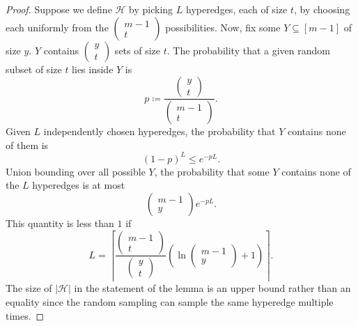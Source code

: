 \documentclass{article}
\begin{document}
\begin{proof}
    Suppose we define $\mathcal{H}$ by picking $L$ hyperedges, each of size $t$, by choosing each uniformly from the $\left(\begin{smallmatrix}m-1\\t\end{smallmatrix}\right)$ possibilities. Now, fix some $Y \subseteq [m-1]$ of size $y$. $Y$ contains $\left(\begin{smallmatrix}y\\t\end{smallmatrix}\right)$ sets of size $t$. The probability that a given random subset of size $t$ lies inside $Y$ is
    \begin{equation}
        p \coloneq \frac{\begin{pmatrix}
            y\\t
        \end{pmatrix}}{\begin{pmatrix}
            m-1\\t
        \end{pmatrix}}.
    \end{equation}
    Given $L$ independently chosen hyperedges, the probability that $Y$ contains none of them is
    \begin{equation}
        (1-p)^L \leq e^{-pL}.
    \end{equation}
    Union bounding over all possible $Y$, the probability that some $Y$ contains none of the $L$ hyperedges is at most
    \begin{equation}
        \begin{pmatrix}
            m-1\\y
        \end{pmatrix}e^{-pL}.
    \end{equation}
    This quantity is less than $1$ if
    \begin{equation}
        L = \left\lceil\frac{\begin{pmatrix}
            m-1\\t
        \end{pmatrix}}{\begin{pmatrix}
            y\\t
        \end{pmatrix}}\left(\ln\begin{pmatrix}
            m-1\\y
        \end{pmatrix}+1\right)\right\rceil.
    \end{equation}
    The size of $|\mathcal{H}|$ in the statement of the lemma is an upper bound rather than an equality since the random sampling can sample the same hyperedge multiple times.
\end{proof}
\end{document}
